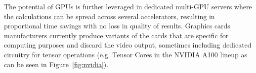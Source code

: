 The potential of GPUs is further leveraged in dedicated multi-GPU servers where the calculations can be spread across several accelerators, resulting in proportional time savings with no loss in quality of results. Graphics cards manufacturers currently produce variants of the cards that are specific for computing purposes and discard the video output, sometimes including dedicated circuitry for tensor operations (e.g. Tensor Cores in the NVIDIA A100 lineup  as can be seen in Figure~\ref{fig:nvidia}).
